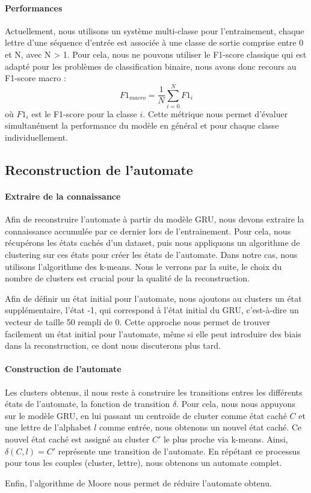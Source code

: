 \documentclass{article}
\begin{document}
\label{sec:model-perf}
\paragraph{Performances} Actuellement, nous utilisons un système multi-classe pour l'entrainement, chaque lettre d'une séquence d'entrée est associée à une classe de 
sortie comprise entre 0 et N, avec N > 1. Pour cela, nous ne pouvons utiliser le F1-score classique qui est adapté pour les problèmes de classification binaire, nous avons 
donc recours au F1-score macro : $$F1_{macro} = \frac{1}{N} \sum_{i=0}^{N} F1_i$$
où $F1_i$ est le F1-score pour la classe $i$. Cette métrique nous permet d'évaluer simultanément la performance du modèle en général et pour chaque classe individuellement.



\subsection{Reconstruction de l'automate}

\paragraph{Extraire de la connaissance} Afin de reconstruire l'automate à partir du modèle GRU, nous devons extraire la connaissance accumulée par ce dernier lors de l'entrainement.
Pour cela, nous récupérons les états cachés d'un dataset, puis nous appliquons un algorithme de clustering sur ces états pour créer les états de l'automate. Dans notre cas, nous
utilisons l'algorithme des k-means. Nous le verrons par la suite, le choix du nombre de clusters est crucial pour la qualité de la reconstruction.
\par Afin de définir un état initial pour l'automate, nous ajoutons au clusters un état supplémentaire, l'état -1, qui correspond à l'état initial du GRU, c'est-à-dire un vecteur de taille 50
rempli de 0. Cette approche nous permet de trouver facilement un état initial pour l'automate, même si elle peut introduire des biais dans la reconstruction, ce dont nous discuterons plus tard. 

\newpage
\paragraph{Construction de l'automate} Les clusters obtenus, il nous reste à construire les transitions entres les différents états de l'automate, la fonction de transition $\delta$. 
Pour cela, nous nous appuyons sur le modèle GRU, en lui passant un centroïde de cluster comme état caché $C$ et une lettre de l'alphabet $l$ comme entrée, nous obtenons un nouvel 
état caché. Ce nouvel état caché est assigné au cluster $C'$ le plus proche via k-means. Ainsi, $\delta(C, l) = C'$ représente une transition de l'automate. En répétant ce 
processus pour tous les couples (cluster, lettre), nous obtenons un automate complet.
\par Enfin, l'algorithme de Moore nous permet de réduire l'automate obtenu.
\end{document}
